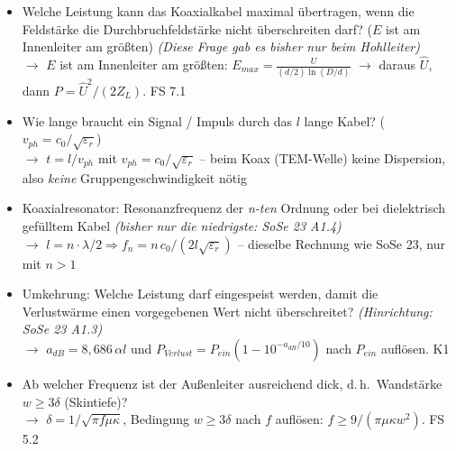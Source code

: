 \documentclass[a4paper,10pt]{article}
\begin{document}
\par\vspace{5mm}
\begin{tcolorbox}[colback=A1Farbe!4, colframe=A1Farbe!55, boxrule=0.5pt, arc=1mm, left=3mm, right=2mm, top=2mm, bottom=2mm, breakable, title={\sffamily\bfseries\small Was diesmal neu drankommen könnte \normalfont\itshape\footnotesize -- eigene Prognose (keine offizielle Ankündigung): Umkehrungen, Kombinationen und Transfers zwischen den Aufgabentypen}, coltitle=white, colbacktitle=A1Farbe!70]
\sffamily\small
\begin{itemize}\setlength{\itemsep}{2.2mm}\setlength{\leftmargini}{4mm}
\item Welche Leistung kann das Koaxialkabel maximal übertragen, wenn die Feldstärke die Durchbruchfeldstärke nicht überschreiten darf? ($E$ ist am Innenleiter am größten) \textcolor{Grau}{\itshape(Diese Frage gab es bisher nur beim Hohlleiter)}\\[0.6mm] {\footnotesize\color{A1Farbe}$\rightarrow$ $E$ ist am Innenleiter am größten: $E_{max}=\frac{U}{(d/2)\ln(D/d)}$ $\to$ daraus $\hat{U}$, dann $P=\hat{U}^2/(2Z_L)$. FS 7.1}
\item Wie lange braucht ein Signal / Impuls durch das $l$ lange Kabel? ($v_{ph}=c_0/\sqrt{\varepsilon_r}$)\\[0.6mm] {\footnotesize\color{A1Farbe}$\rightarrow$ $t=l/v_{ph}$ mit $v_{ph}=c_0/\sqrt{\varepsilon_r}$ -- beim Koax (TEM-Welle) keine Dispersion, also \emph{keine} Gruppengeschwindigkeit nötig}
\item Koaxialresonator: Resonanzfrequenz der \emph{n-ten} Ordnung oder bei dielektrisch gefülltem Kabel \textcolor{Grau}{\itshape(bisher nur die niedrigste: SoSe 23 A1.4)}\\[0.6mm] {\footnotesize\color{A1Farbe}$\rightarrow$ $l=n\cdot\lambda/2 \Rightarrow f_n=n\,c_0/(2l\sqrt{\varepsilon_r})$ -- dieselbe Rechnung wie SoSe 23, nur mit $n>1$}
\item Umkehrung: Welche Leistung darf eingespeist werden, damit die Verlustwärme einen vorgegebenen Wert nicht überschreitet? \textcolor{Grau}{\itshape(Hinrichtung: SoSe 23 A1.3)}\\[0.6mm] {\footnotesize\color{A1Farbe}$\rightarrow$ $a_{dB}=8{,}686\,\alpha l$ und $P_{Verlust}=P_{ein}(1-10^{-a_{dB}/10})$ nach $P_{ein}$ auflösen. K1}
\item Ab welcher Frequenz ist der Außenleiter \glqq ausreichend dick\grqq, d.\,h.\ Wandstärke $w \ge 3\delta$ (Skintiefe)?\\[0.6mm] {\footnotesize\color{A1Farbe}$\rightarrow$ $\delta=1/\sqrt{\pi f\mu\kappa}$, Bedingung $w\ge 3\delta$ nach $f$ auflösen: $f\ge 9/(\pi\mu\kappa w^2)$. FS 5.2}

\end{itemize}
\end{tcolorbox}
\end{document}
